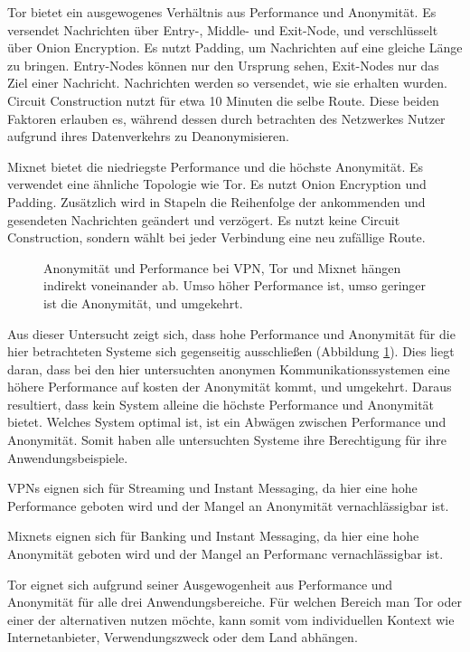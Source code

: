 Tor bietet ein ausgewogenes Verhältnis aus Performance und Anonymität. Es versendet Nachrichten über Entry-, Middle- und Exit-Node, und verschlüsselt über Onion Encryption. Es nutzt Padding, um Nachrichten auf eine gleiche Länge zu bringen. Entry-Nodes können nur den Ursprung sehen, Exit-Nodes nur das Ziel einer Nachricht. Nachrichten werden so versendet, wie sie erhalten wurden. Circuit Construction nutzt für etwa 10 Minuten die selbe Route. Diese beiden Faktoren erlauben es, während dessen durch betrachten des Netzwerkes Nutzer aufgrund ihres Datenverkehrs zu Deanonymisieren.

Mixnet bietet die niedriegste Performance und die höchste Anonymität. Es verwendet eine ähnliche Topologie wie Tor. Es nutzt Onion Encryption und Padding. Zusätzlich wird in Stapeln die Reihenfolge der ankommenden und gesendeten Nachrichten geändert und verzögert. Es nutzt keine Circuit Construction, sondern wählt bei jeder Verbindung eine neu zufällige Route.

\begin{figure}[h!]
    \centering
    
    \caption{Anonymität und Performance bei VPN, Tor und Mixnet hängen indirekt voneinander ab. Umso höher Performance ist, umso geringer ist die Anonymität, und umgekehrt.}
    \label{imgs:systems_discussion}
\end{figure}

Aus dieser Untersucht zeigt sich, dass hohe Performance und Anonymität für die hier betrachteten Systeme sich gegenseitig ausschließen (Abbildung \ref{imgs:systems_discussion}). Dies liegt daran, dass bei den hier untersuchten anonymen Kommunikationssystemen eine höhere Performance auf kosten der Anonymität kommt, und umgekehrt. Daraus resultiert, dass kein System alleine die höchste Performance und Anonymität bietet. Welches System optimal ist, ist ein Abwägen zwischen Performance und Anonymität. Somit haben alle untersuchten Systeme ihre Berechtigung für ihre Anwendungsbeispiele.

VPNs eignen sich für Streaming und Instant Messaging, da hier eine hohe Performance geboten wird und der Mangel an Anonymität vernachlässigbar ist.

Mixnets eignen sich für Banking und Instant Messaging, da hier eine hohe Anonymität geboten wird und der Mangel an Performanc vernachlässigbar ist.

Tor eignet sich aufgrund seiner Ausgewogenheit aus Performance und Anonymität für alle drei Anwendungsbereiche. Für welchen Bereich man Tor oder einer der alternativen nutzen möchte, kann somit vom individuellen Kontext wie Internetanbieter, Verwendungszweck oder dem Land abhängen.

